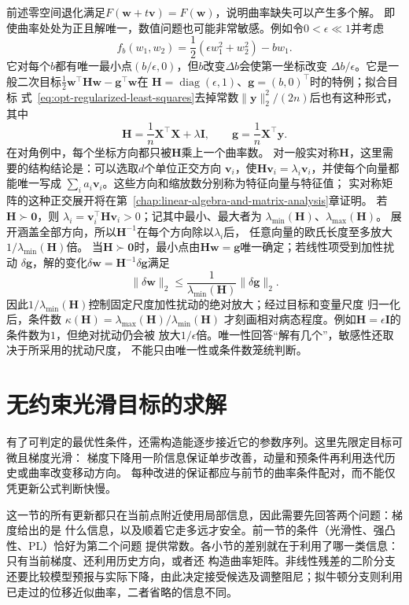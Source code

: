 前述零空间退化满足$F(\bm w+t\bm v)=F(\bm w)$，说明曲率缺失可以产生多个解。
即使曲率处处为正且解唯一，数值问题也可能非常敏感。例如令$0<\epsilon\ll1$并考虑
\[
  f_b(w_1,w_2)=\frac12(\epsilon w_1^2+w_2^2)-bw_1.
\]
它对每个$b$都有唯一最小点$(b/\epsilon,0)$，但$b$改变$\Delta b$会使第一坐标改变
$\Delta b/\epsilon$。它是一般二次目标$\frac12\bm w^\top\bm H\bm w-\bm g^\top\bm w$在
$\bm H=\operatorname{diag}(\epsilon,1)$、$\bm g=(b,0)^\top$时的特例；拟合目标
式~\eqref{eq:opt-regularized-least-squares}去掉常数$\lVert\bm y\rVert_2^2/(2n)$后也有这种形式，其中
\[
  \bm{H}=\frac{1}{n}\bm{X}^{\top}\bm{X}+\lambda\bm{I},\qquad
  \bm g=\frac1n\bm X^\top\bm y.
\]
在对角例中，每个坐标方向都只被$\bm H$乘上一个曲率数。
对一般实对称$\bm H$，这里需要的结构结论是：可以选取$d$个单位正交方向
$\bm v_i$，使$\bm H\bm v_i=\lambda_i\bm v_i$，并使每个向量都能唯一写成
$\sum_i a_i\bm v_i$。这些方向和缩放数分别称为特征向量与特征值；
实对称矩阵的这种正交展开将在第~\ref{chap:linear-algebra-and-matrix-analysis}章证明。
若$\bm H\succ\bm0$，则
$\lambda_i=\bm v_i^\top\bm H\bm v_i>0$；记其中最小、最大者为
$\lambda_{\min}(\bm H)$、$\lambda_{\max}(\bm H)$。
展开涵盖全部方向，所以$\bm H^{-1}$在每个方向除以$\lambda_i$后，
任意向量的欧氏长度至多放大$1/\lambda_{\min}(\bm H)$倍。
当$\bm{H}\succ\bm{0}$时，最小点由$\bm H\bm w=\bm g$唯一确定；若线性项受到加性扰动
$\delta\bm{g}$，解的变化$\delta\bm w=\bm H^{-1}\delta\bm g$满足
\[
  \lVert\delta\bm{w}\rVert_2
  \leq
  \frac{1}{\lambda_{\min}(\bm{H})}
  \lVert\delta\bm{g}\rVert_2.
\]
因此$1/\lambda_{\min}(\bm{H})$控制固定尺度加性扰动的绝对放大；经过目标和变量尺度
归一化后，条件数
$\kappa(\bm{H})=\lambda_{\max}(\bm{H})/\lambda_{\min}(\bm{H})$
才刻画相对病态程度。例如$\bm{H}=\epsilon\bm{I}$的条件数为$1$，但绝对扰动仍会被
放大$1/\epsilon$倍。唯一性回答“解有几个”，敏感性还取决于所采用的扰动尺度，
不能只由唯一性或条件数笼统判断。

\section{无约束光滑目标的求解}
\label{sec:opt-smooth-iterative-methods}

有了可判定的最优性条件，还需构造能逐步接近它的参数序列。这里先限定目标可微且梯度光滑：
梯度下降用一阶信息保证单步改善，动量和预条件再利用迭代历史或曲率改变移动方向。
每种改进的保证都应与前节的曲率条件配对，而不能仅凭更新公式判断快慢。

这一节的所有更新都只在当前点附近使用局部信息，因此需要先回答两个问题：梯度给出的是
什么信息，以及顺着它走多远才安全。前一节的条件（光滑性、强凸性、PL）恰好为第二个问题
提供常数。各小节的差别就在于利用了哪一类信息：只有当前梯度、还利用历史方向，或者还
构造曲率矩阵。非线性残差的二阶分支还要比较模型预报与实际下降，由此决定接受候选及调整阻尼；拟牛顿分支则利用已走过的位移近似曲率，二者省略的信息不同。

